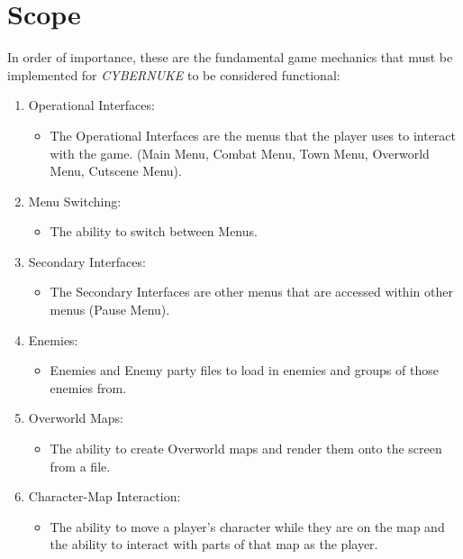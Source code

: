 \documentclass[10pt,conference,onecolumn,compsoc]{IEEEtran}
\begin{document}
\pagebreak
\section{Scope}
In order of importance, these are the fundamental game mechanics that must be implemented for \emph{CYBERNUKE} to be considered functional:

\begin{flushleft}


\begin{enumerate}

\item Operational Interfaces:
\begin{itemize}
\item The Operational Interfaces are the menus that the player uses to interact with the game. (Main Menu, Combat Menu, Town Menu, Overworld Menu, Cutscene Menu).
\end{itemize}

\item Menu Switching:
\begin{itemize}
\item The ability to switch between Menus.
\end{itemize}

\item Secondary Interfaces:
\begin{itemize}
\item The Secondary Interfaces are other menus that are accessed within other menus (Pause Menu).
\end{itemize}

\item Enemies:
\begin{itemize}
\item Enemies and Enemy party files to load in enemies and groups of those enemies from.
\end{itemize}

\item Overworld Maps:
\begin{itemize}
\item The ability to create Overworld maps and render them onto the screen from a file.
\end{itemize}

\item Character-Map Interaction:
\begin{itemize}
\item The ability to move a player's character while they are on the map and the ability to interact with parts of that map as the player.
\end{itemize}


\end{enumerate}
\end{flushleft}
\end{document}
